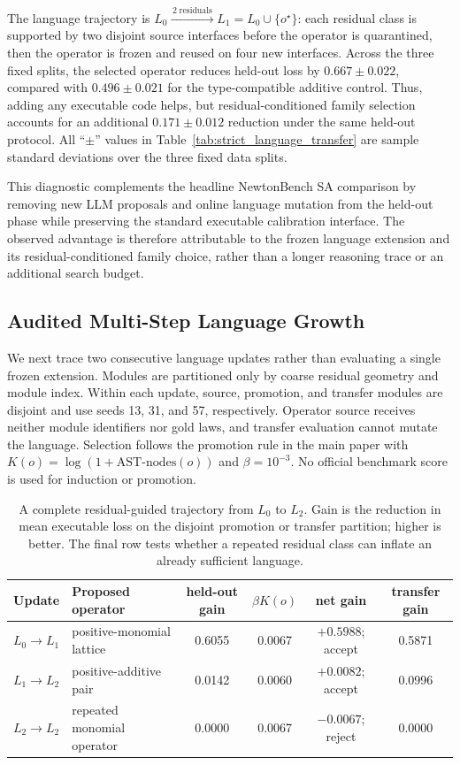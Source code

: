 \documentclass[letterpaper]{article}
\newcommand{\tblhdr}{\rowcolor{headerrow}}
\begin{document}
The language trajectory is $L_0\xrightarrow{\,2\;\mathrm{residuals}\,}
L_1=L_0\cup\{o^\star\}$: each residual class is supported by two disjoint
source interfaces before the operator is quarantined, then the operator is
frozen and reused on four new interfaces. Across the three fixed splits, the
selected operator reduces held-out loss by $0.667\pm0.022$, compared with
$0.496\pm0.021$ for the type-compatible additive control. Thus, adding any
executable code helps, but residual-conditioned family selection accounts for
an additional $0.171\pm0.012$ reduction under the same held-out protocol.
All ``$\pm$'' values in Table~\ref{tab:strict_language_transfer} are sample
standard deviations over the three fixed data splits.

This diagnostic complements the headline NewtonBench SA comparison by removing
new LLM proposals and online language mutation from the held-out phase while
preserving the standard executable calibration interface. The observed
advantage is therefore attributable to the frozen language extension and its
residual-conditioned family choice, rather than a longer reasoning trace or an
additional search budget.

\subsection*{Audited Multi-Step Language Growth}

We next trace two consecutive language updates rather than evaluating a single
frozen extension. Modules are partitioned only by coarse residual geometry and
module index. Within each update, source, promotion, and transfer modules are
disjoint and use seeds 13, 31, and 57, respectively. Operator source receives
neither module identifiers nor gold laws, and transfer evaluation cannot mutate
the language. Selection follows the promotion rule in the main paper with
$K(o)=\log(1+\text{AST-nodes}(o))$ and $\beta=10^{-3}$. No official benchmark
score is used for induction or promotion.

\begin{table}[!htbp]
\centering
\small
\begin{tabularx}{0.98\textwidth}{|c|Y|c|c|c|c|}
\hline
\tblhdr
Update & Proposed operator & held-out gain & $\beta K(o)$ & net gain & transfer gain \\
\hline
{}
$L_0\!\rightarrow\!L_1$ & positive-monomial lattice & 0.6055 & 0.0067 & $+0.5988$; accept & 0.5871 \\
\hline
{}
$L_1\!\rightarrow\!L_2$ & positive-additive pair & 0.0142 & 0.0060 & $+0.0082$; accept & 0.0996 \\
\hline
{}
$L_2\!\rightarrow\!L_2$ & repeated monomial operator & 0.0000 & 0.0067 & $-0.0067$; reject & 0.0000 \\
\hline
\end{tabularx}
\caption{A complete residual-guided trajectory from $L_0$ to $L_2$. Gain is
the reduction in mean executable loss on the disjoint promotion or transfer
partition; higher is better. The final row tests whether a repeated residual
class can inflate an already sufficient language.}
\label{tab:multistep_language_growth}
\end{table}
\end{document}

